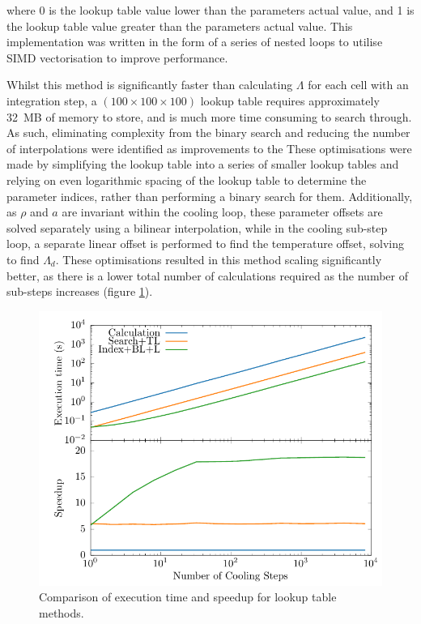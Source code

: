 \noindent
where 0 is the lookup table value lower than the parameters actual value, and 1 is the lookup table value greater than the parameters actual value.
This implementation was written in the form of a series of nested loops to utilise SIMD vectorisation to improve performance.


Whilst this method is significantly faster than calculating $\Lambda$ for each cell with an integration step, a $(100 \times 100 \times 100)$ lookup table requires approximately \SI{32}{\mega B} of memory to store, and is much more time consuming to search through.
As such, eliminating complexity from the binary search and reducing the number of interpolations were identified as improvements to the 
These optimisations were made by simplifying the lookup table into a series of smaller lookup tables and relying on even logarithmic spacing of the lookup table to determine the parameter indices, rather than performing a binary search for them.
Additionally, as $\rho$ and $a$ are invariant within the cooling loop, these parameter offsets are solved separately using a bilinear interpolation, while in the cooling sub-step loop, a separate linear offset is performed to find the temperature offset, solving to find $\Lambda_d$. These optimisations resulted in this method scaling significantly better, as there is a lower total number of calculations required as the number of sub-steps increases (figure \ref{fig:dust-opt-speedup}).

\begin{figure}[h]
  \centering
  \includegraphics{assets/lambda-dust-speedup/lambda-dust-speedup.pdf}
  \caption[Dust lookup table methods comparison]{Comparison of execution time and speedup for lookup table methods.}
  \label{fig:dust-opt-speedup}
\end{figure}

